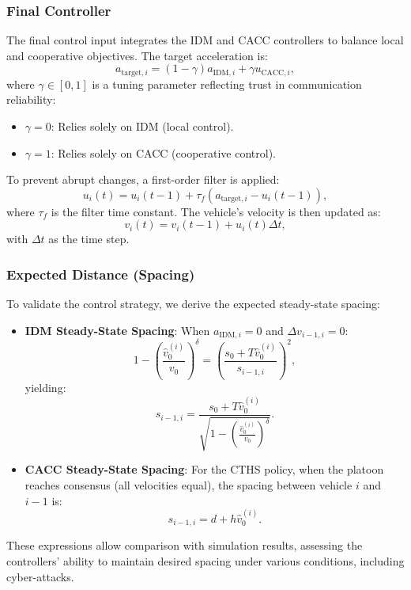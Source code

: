 \documentclass[letterpaper, 10pt, conference]{ieeeconf}  %
\begin{document}
\subsubsection{Final Controller}
The final control input integrates the IDM and CACC controllers to balance local and cooperative objectives. The target acceleration is:
\begin{equation}
    a_{\text{target},i} = (1 - \gamma) a_{\text{IDM},i} + \gamma u_{\text{CACC},i},
\end{equation}
where $\gamma \in [0,1]$ is a tuning parameter reflecting trust in communication reliability:
\begin{itemize}
    \item $\gamma = 0$: Relies solely on IDM (local control).
    \item $\gamma = 1$: Relies solely on CACC (cooperative control).
\end{itemize}
To prevent abrupt changes, a first-order filter is applied:
\begin{equation}
    u_i(t) = u_i(t-1) + \tau_f (a_{\text{target},i} - u_i(t-1)),
\end{equation}
where $\tau_f$ is the filter time constant. The vehicle's velocity is then updated as:
\begin{equation}
    v_i(t) = v_i(t-1) + u_i(t) \Delta t,
\end{equation}
with $\Delta t$ as the time step.

\subsubsection{Expected Distance (Spacing)}
To validate the control strategy, we derive the expected steady-state spacing:
\begin{itemize}
    \item \textbf{IDM Steady-State Spacing}: When $a_{\text{IDM},i} = 0$ and $\Delta v_{i-1,i} = 0$:
    \[
    1 - \left( \frac{\hat{v}_0^{(i)}}{v_0} \right)^\delta = \left( \frac{s_0 + T \hat{v}_0^{(i)}}{s_{i-1,i}} \right)^2,
    \]
    yielding:
    \[
    s_{i-1,i} = \frac{s_0 + T \hat{v}_0^{(i)}}{\sqrt{1 - \left( \frac{\hat{v}_0^{(i)}}{v_0} \right)^\delta}}.
    \]
    \item \textbf{CACC Steady-State Spacing}: For the CTHS policy, when the platoon reaches consensus (all velocities equal), the spacing between vehicle $i$ and $i-1$ is:
    \[
    s_{i-1,i} = d + h \hat{v}_0^{(i)}.
    \]
\end{itemize}
These expressions allow comparison with simulation results, assessing the controllers' ability to maintain desired spacing under various conditions, including cyber-attacks.
\end{document}
